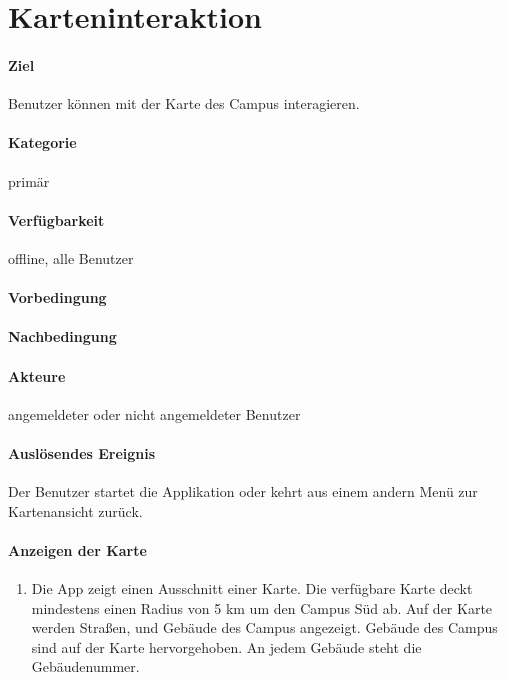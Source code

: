 \section{Karteninteraktion}
\paragraph{Ziel}
Benutzer können mit der Karte des Campus interagieren.
\paragraph{Kategorie}
primär
\paragraph{Verfügbarkeit}
offline, alle Benutzer
\paragraph{Vorbedingung}

\paragraph{Nachbedingung}

\paragraph{Akteure}
angemeldeter oder nicht angemeldeter Benutzer
\paragraph{Auslösendes Ereignis}
Der Benutzer startet die Applikation oder kehrt aus einem andern Menü zur Kartenansicht zurück.
\paragraph{Anzeigen der Karte}
\begin{enumerate}[start=10, label=\textbf{/FA\arabic*/}, align=left]
    \item Die App zeigt einen Ausschnitt einer Karte. Die verfügbare Karte deckt mindestens einen Radius von 5 km um den Campus Süd ab. Auf der Karte werden Straßen, und Gebäude des Campus angezeigt. Gebäude des Campus sind auf der Karte hervorgehoben. An jedem Gebäude steht die Gebäudenummer.
\end{enumerate}
